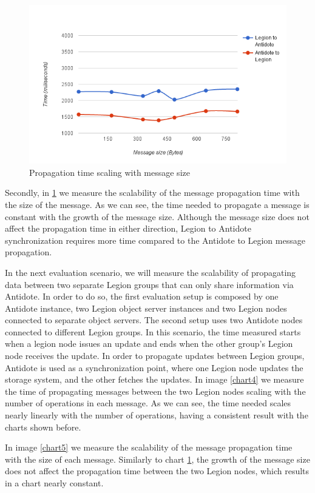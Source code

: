 \begin{figure}[h]
\centering
\includegraphics[scale=0.7]{files/chart2.png}
\caption{Propagation time scaling with message size}
\label{chart2}
\end{figure}

Secondly, in \ref{chart2} we  measure the scalability of the message propagation time with the size of the message. As we can see, the time needed to propagate a message is constant with the growth of the message size. Although the message size does not affect the propagation time in either direction, Legion to Antidote synchronization requires more time compared to the Antidote to Legion message propagation.\par
	In the next evaluation scenario, we will measure the scalability of propagating data between two separate Legion groups that can only share information via Antidote. In order to do so, the first evaluation setup is composed by one Antidote instance, two Legion object server instances and two Legion nodes connected to separate object servers. The second setup uses two Antidote nodes connected to different Legion groups. In this scenario, the time measured starts when a legion node issues an update and ends when the other group's Legion node receives the update. In order to propagate updates between Legion groups, Antidote is used as a synchronization point, where one Legion node updates the storage system, and the other fetches the updates. In image \ref{chart4} we measure the time of propagating messages between the two Legion nodes scaling with the number of operations in each message. As we can see, the time needed scales nearly linearly with the number of operations, having a consistent result with the charts shown before.\par
	In image \ref{chart5} we measure the scalability of the message propagation time with the size of each message. Similarly to chart \ref{chart2}, the growth of the message size does not affect the propagation time between the two Legion nodes, which results in a chart nearly constant.

